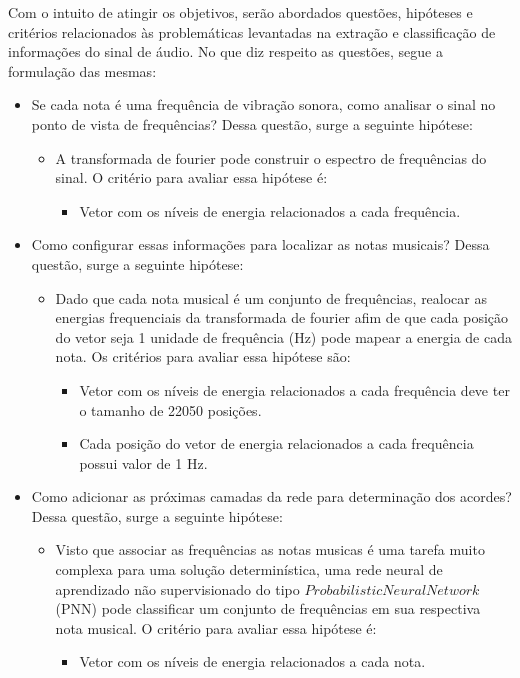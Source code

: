 Com o intuito de atingir os objetivos, serão abordados questões, hipóteses e critérios relacionados às problemáticas levantadas na extração e classificação de informações do sinal de áudio. No que diz respeito as questões, segue a formulação das mesmas:
\begin{itemize}
	\item Se cada nota é uma frequência de vibração sonora, como analisar o sinal no ponto de vista de frequências? Dessa questão, surge a seguinte hipótese:
	\begin{itemize}
		\item A transformada de fourier pode construir o espectro de frequências do sinal. O critério para avaliar essa hipótese é:
			\begin{itemize}
				\item Vetor com os níveis de energia relacionados a cada frequência.		
			\end{itemize}
	\end{itemize}

	\item Como configurar essas informações para localizar as notas musicais? Dessa questão, surge a seguinte hipótese:
	\begin{itemize}
		\item Dado que cada nota musical é um conjunto de frequências, realocar as energias frequenciais da transformada de fourier afim de que cada posição do vetor seja 1 unidade de frequência (Hz) pode mapear a energia de cada nota. Os critérios para avaliar essa hipótese são:
			\begin{itemize}
				\item Vetor com os níveis de energia relacionados a cada frequência deve ter o tamanho de 22050 posições.
				\item Cada posição do vetor de energia relacionados a cada frequência possui valor de 1 Hz.		
			\end{itemize}
	\end{itemize}

	\item Como adicionar as próximas camadas da rede para determinação dos acordes? Dessa questão, surge a seguinte hipótese:
	\begin{itemize}
		\item  Visto que associar as frequências as notas musicas é uma tarefa muito complexa para uma solução determinística, uma rede neural de aprendizado não supervisionado do tipo $Probabilistic Neural Network$ (PNN) pode classificar um conjunto de frequências em sua respectiva nota musical. O critério para avaliar essa hipótese é:
			\begin{itemize}
				\item Vetor com os níveis de energia relacionados a cada nota.		
			\end{itemize}
	\end{itemize}
	

\end{itemize}
